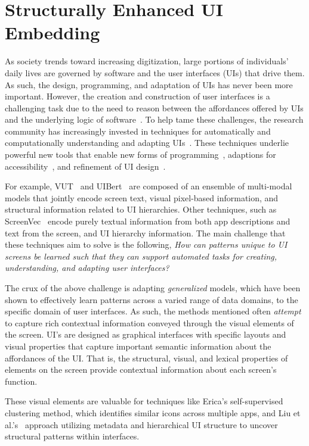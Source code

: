 \section{Structurally Enhanced UI Embedding}
\label{sec:FRAME}

As society trends toward increasing digitization, large portions of individuals' daily lives are governed by software and the user interfaces (UIs) that drive them. As such, the design, programming, and adaptation of UIs has never been more important. However, the creation and construction of user interfaces is a challenging task due to the need to reason between the affordances offered by UIs and the underlying logic of software~\cite{Myers:CHD94}. To help tame these challenges, the research community has increasingly invested in techniques for automatically and computationally understanding and adapting UIs~\cite{li2021vut,bai2021uibert,Li21}. These techniques underlie powerful new tools that enable new forms of programming~\cite{DBLP:journals/corr/abs-1802-02312}, adaptions for accessibility~\cite{9284063}, and refinement of UI design~\cite{mansur2023aidui}.

For example, VUT~\cite{li2021vut} and UIBert~\cite{bai2021uibert} are composed of an ensemble of multi-modal models that jointly encode screen text, visual pixel-based information, and structural information related to UI hierarchies. Other techniques, such as ScreenVec~\cite{Li21} encode purely textual information from both app descriptions and text from the screen, and UI hierarchy information. The main challenge that these techniques aim to solve is the following, \textit{How can patterns unique to UI screens be learned such that they can support automated tasks for creating, understanding, and adapting user interfaces?}

The crux of the above challenge is adapting \textit{generalized} models, which have been shown to effectively learn patterns across a varied range of data domains, to the specific domain of user interfaces. As such, the methods mentioned often \textit{attempt} to capture rich contextual information conveyed through the visual elements of the screen. UI's are designed as graphical interfaces with specific layouts and visual properties that capture important semantic information about the affordances of the UI. That is, the structural, visual, and lexical properties of elements on the screen provide contextual information about each screen's function. 

These visual elements are valuable for techniques like Erica's \cite{Deka16} self-supervised clustering method, which identifies similar icons across multiple apps, and Liu et al.'s~\cite{Liu18} approach utilizing metadata and hierarchical UI structure to uncover structural patterns within interfaces. 

